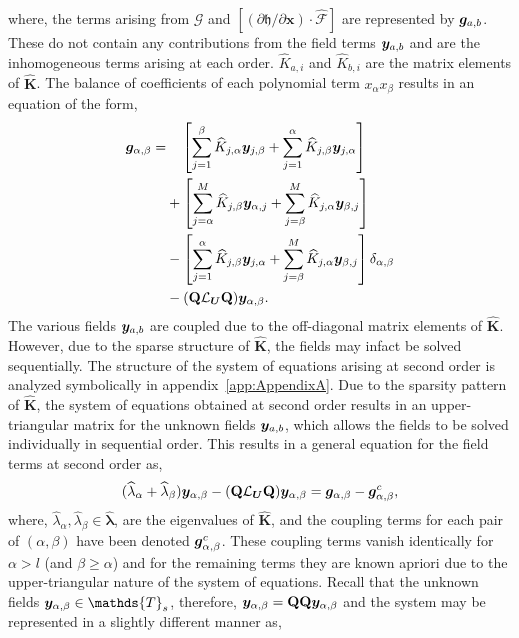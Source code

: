 where, the terms arising from $\mathcal{G}$ and $[(\partial \mathfrak{h}/\partial \mathbf{x})\cdot \mathcal{\widehat{F}}]$ are represented by $\boldsymbol{g}_{a,b}$. These do not contain any contributions from the field terms $\boldsymbol{y}_{a,b}$ and are the inhomogeneous terms arising at each order.  $\widehat{K}_{a,i}$ and $\widehat{K}_{b,i}$ are the matrix elements of $\mathbf{\widehat{K}}$. The balance of coefficients of each polynomial term $x_{\alpha}x_{\beta}$ results in an equation of the form,
\begin{align}
	\label{eqn:second_order_alpha_beta_terms}
	\begin{split}
		 \boldsymbol{g}_{\alpha,\beta} =& \ \ \ \left[\sum_{j=1}^{\beta}\widehat{K}_{j,\alpha}\boldsymbol{y}_{j,\beta} + \sum_{j=1}^{\alpha}\widehat{K}_{j,\beta}\boldsymbol{y}_{j,\alpha} \right] \\
		& + \left[\sum_{j=\alpha}^{M}\widehat{K}_{j,\beta}\boldsymbol{y}_{\alpha,j} + \sum_{j=\beta}^{M}\widehat{K}_{j,\alpha}\boldsymbol{y}_{\beta,j} \right] \\
		& - \left[\sum_{j=1}^{\alpha}\widehat{K}_{j,\beta}\boldsymbol{y}_{j,\alpha} + \sum_{j=\beta}^{M}\widehat{K}_{j,\alpha}\boldsymbol{y}_{\beta,j} \right]\delta_{\alpha,\beta} \\
		& - (\mathbf{Q}\mathcal{L}_{\boldsymbol{U}}\mathbf{Q})\boldsymbol{y}_{\alpha,\beta}.
	\end{split}
\end{align}
The various fields $\boldsymbol{y}_{a,b}$ are coupled due to the off-diagonal matrix elements of $\mathbf{\widehat{K}}$. However, due to the sparse structure of $\mathbf{\widehat{K}}$, the fields may infact be solved sequentially. The structure of the system of equations arising at second order is analyzed symbolically in appendix~\ref{app:AppendixA}. Due to the sparsity pattern of $\mathbf{\widehat{K}}$, the system of equations obtained at second order results in an upper-triangular matrix for the unknown fields $\boldsymbol{y}_{a,b}$, which allows the fields to be solved individually in sequential order. This results in a general equation for the field terms at second order as,
\begin{align}
	(\widehat{\lambda}_{\alpha} + \widehat{\lambda}_{\beta})\boldsymbol{y}_{\alpha,\beta} 
	- (\mathbf{Q}\mathcal{L}_{\boldsymbol{U}}\mathbf{Q})\boldsymbol{y}_{\alpha,\beta} = \boldsymbol{g}_{\alpha,\beta} - \boldsymbol{g}^{c}_{\alpha,\beta}, \nonumber
\end{align}
where, $\widehat{\lambda}_{\alpha},\widehat{\lambda}_{\beta} \in \widehat{\boldsymbol{\lambda}}$, are the eigenvalues of $\mathbf{\widehat{K}}$, and the coupling terms for each pair of $(\alpha,\beta)$ have been denoted $\boldsymbol{g}^{c}_{\alpha,\beta}$. These coupling terms vanish identically for $\alpha > l $ (and $\beta\ge\alpha$) and for the remaining terms they are known apriori due to the upper-triangular nature of the system of equations. Recall that the unknown fields $\vfield{y}_{\alpha,\beta}\in\mathds{T}_{s}$, therefore, $\boldsymbol{y}_{\alpha,\beta} = \mathbf{Q}\mathbf{Q}\boldsymbol{y}_{\alpha,\beta}$ and the system may be represented in a slightly different manner as, 
